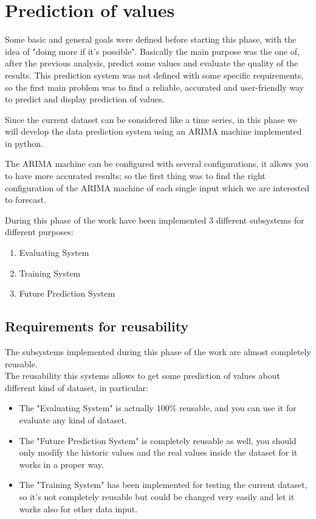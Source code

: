 
\chapter{Prediction of values}

Some basic and general goals were defined before starting this phase, with the idea of "doing more if it's possible". Basically the main purpose was the one of, after the previous analysis, predict some values and evaluate the quality of the results.
This prediction system was not defined with some specific requirements, so the first main problem was to find a reliable, accurated and user-friendly way to predict and display prediction of values.

Since the current dataset can be considered like a time series, in this phase we will develop the data prediction system using an ARIMA machine implemented in python.

The ARIMA machine can be configured with several configurations, it allows you to have more accurated results; so the first thing was to find the right configuration of the ARIMA machine of each single input which we are interested to forecast.

During this phase of the work have been implemented 3 different subsystems for different purposes:
\begin{enumerate}
\item Evaluating System
\item Training System
\item Future Prediction System
\end{enumerate}

\newpage 

\section{Requirements for reusability}
The subsystems implemented during this phase of the work are almost completely reusable.\\
The reusability this systems allows to get some prediction of values about different kind of dataset, in particular:
\begin{itemize}
\item The "Evaluating System" is actually 100\% reusable, and you can use it for evaluate any kind of dataset.
\item The "Future Prediction System" is completely reusable as well, you should only modify the historic values and the real values inside the dataset for it works in a proper way.
\item The "Training System" has been implemented for testing the current dataset, so it's not completely reusable but could be changed very easily and let it works also for other data input.
\end{itemize}

